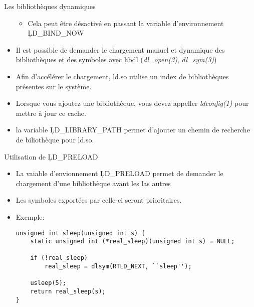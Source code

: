 \begin{frame}[fragile=singleslide]{  Les bibliothèques dynamiques}
\begin{itemize}
\begin{itemize}
    \item   Cela  peut   être   désactivé  en   passant  la   variable
      d'environnement \c{LD_BIND_NOW}
    \end{itemize} 
  \item Il est possible de  demander le chargement manuel et dynamique
    des    bibliothèques    et    des    symboles    avec    \c{libdl}
    (\emph{dl\_open(3)}, \emph{dl\_sym(3)})
  \item Afin d'accélérer le  chargement, \c{ld.so} utilise un index de
    bibliothèques présentes  sur le  système.
  \item  Lorsque vous  ajoutez une  bibliothèque, vous  devez appeller
    \emph{ldconfig(1)} pour mettre à jour ce cache.
  \item la variable \c{LD_LIBRARY_PATH}  permet d'ajouter un chemin de
    recherche de biliothèque pour \c{ld.so}.
  \end{itemize} 
\end{frame} 

\begin{frame}[fragile=singleslide]{Utilisation de \c{LD_PRELOAD}}
  \begin{itemize} 
  \item La vaiable d'envionnement \c{LD_PRELOAD} permet de demander le
    chargement d'une bibliothèque avant  les las autres
  \item Les symboles exportées par celle-ci seront prioritaires.
  \item Exemple:
    \begin{lstlisting} 
unsigned int sleep(unsigned int s) {
    static unsigned int (*real_sleep)(unsigned int s) = NULL;

    if (!real_sleep)
        real_sleep = dlsym(RTLD_NEXT, ``sleep'');

    usleep(5);
    return real_sleep(s);
}
    \end{lstlisting}
  \end{itemize} 
\end{frame} 


